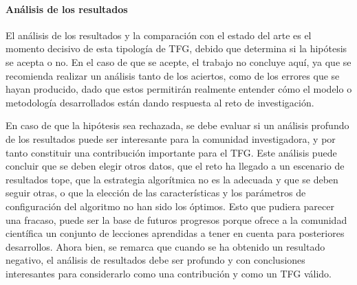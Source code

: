 \paragraph{Análisis de los resultados} El análisis de los resultados y la comparación con el estado del arte es el momento decisivo de esta tipología de TFG, debido que determina si la hipótesis se acepta o no. En el caso de que se acepte, el trabajo no concluye aquí, ya que se recomienda realizar un análisis tanto de los aciertos, como de los errores que se hayan producido, dado que estos permitirán realmente entender cómo el modelo o metodología desarrollados están dando respuesta al reto de investigación.

En caso de que la hipótesis sea rechazada, se debe evaluar si un análisis profundo de los resultados puede ser interesante para la comunidad investigadora, y por tanto constituir una contribución importante para el TFG. Este análisis puede concluir que se deben elegir otros datos, que el reto ha llegado a un escenario de resultados tope, que la estrategia algorítmica no es la adecuada y que se deben seguir otras, o que la elección de las características y los parámetros de configuración del algoritmo no han sido los óptimos. Esto que pudiera parecer una fracaso, puede ser la base de futuros progresos porque ofrece a la comunidad científica un conjunto de lecciones aprendidas a tener en cuenta para posteriores desarrollos. Ahora bien, se remarca que cuando se ha obtenido un resultado negativo, el análisis de resultados debe ser profundo y con conclusiones interesantes para considerarlo como una contribución y como un TFG válido.

